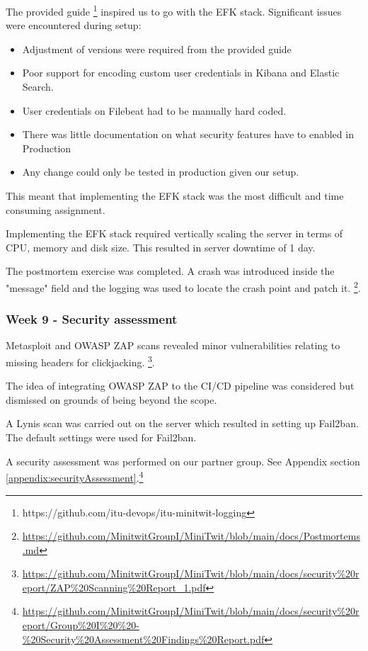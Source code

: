 \documentclass{article}
\begin{document}
The provided guide \footnote{https://github.com/itu-devops/itu-minitwit-logging} inspired us to go with the EFK stack. Significant issues were encountered during setup:

\begin{itemize}
    \item Adjustment of versions were required from the provided guide 
    \item Poor support for encoding custom user credentials in Kibana and Elastic Search.
    \item User credentials on Filebeat had to be manually hard coded.
    \item There was little documentation on what security features have to enabled in Production
    \item Any change could only be tested in production given our setup.
\end{itemize}

This meant that implementing the EFK stack was the most difficult and time consuming assignment. 

Implementing the EFK stack required vertically scaling the server in terms of CPU, memory and disk size. This resulted in server downtime of 1 day. 

The postmortem exercise was completed. A crash was introduced inside the "message" field and the logging was used to locate the crash point and patch it. \footnote{\url{https://github.com/MinitwitGroupI/MiniTwit/blob/main/docs/Postmortems.md}}. 

\subsubsection{Week 9 - Security assessment}

Metasploit and OWASP ZAP scans revealed minor vulnerabilities relating to missing headers for clickjacking.
\footnote{\url{https://github.com/MinitwitGroupI/MiniTwit/blob/main/docs/security\%20report/ZAP\%20Scanning\%20Report_1.pdf}}. 

The idea of integrating OWASP ZAP to the CI/CD pipeline was considered but dismissed on grounds of being beyond the scope.

A Lynis scan was carried out on the server which resulted in setting up Fail2ban. The default settings were used for Fail2ban.

A security assessment was performed on our partner group. See Appendix section  \ref{appendix:securityAssessment}.\footnote{\url{https://github.com/MinitwitGroupI/MiniTwit/blob/main/docs/security\%20report/Group\%20I\%20\%20-\%20Security\%20Assessment\%20Findings\%20Report.pdf}}
\end{document}
